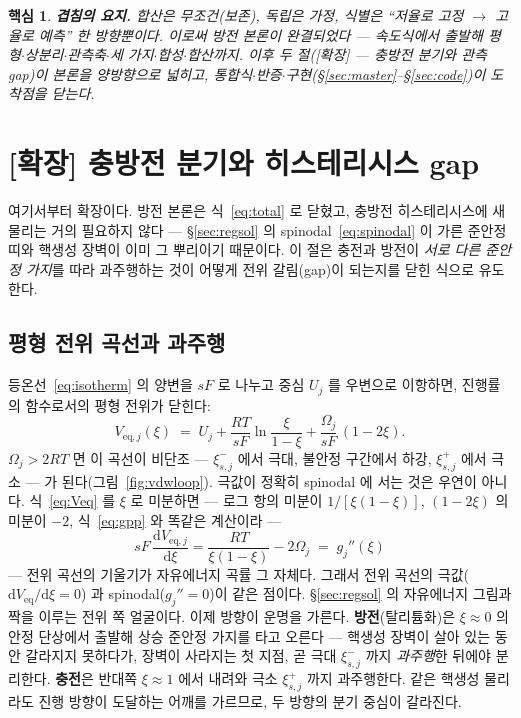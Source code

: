 \documentclass[11pt,a4paper]{article}
\newtheorem*{keybox}{핵심}
\newcommand{\dd}{\mathrm{d}}
\newcommand{\eq}{\mathrm{eq}}
\begin{document}
\begin{keybox}
\textbf{겹침의 요지.} 합산은 무조건(보존), 독립은 가정, 식별은 ``저율로 고정 $\to$ 고율로 예측'' 한
방향뿐이다. 이로써 방전 본론이 완결되었다 — 속도식에서 출발해 평형$\cdot$상분리$\cdot$관측축$\cdot$세
가지$\cdot$합성$\cdot$합산까지. 이후 두 절([확장] — 충방전 분기와 관측 gap)이 본론을 양방향으로
넓히고, 통합식$\cdot$반증$\cdot$구현(\S\ref{sec:master}--\S\ref{sec:code})이 도착점을 닫는다.
\end{keybox}

\section{[확장] 충방전 분기와 히스테리시스 gap}\label{sec:hys}
여기서부터 확장이다. 방전 본론은 식~\eqref{eq:total} 로 닫혔고, 충방전 히스테리시스에 새 물리는
거의 필요하지 않다 — \S\ref{sec:regsol} 의 spinodal~\eqref{eq:spinodal} 이 가른 준안정 띠와
핵생성 장벽이 이미 그 뿌리이기 때문이다. 이 절은 충전과 방전이 \emph{서로
다른 준안정 가지}를 따라 과주행하는 것이 어떻게 전위 갈림(gap)이 되는지를 닫힌 식으로 유도한다.

\subsection{평형 전위 곡선과 과주행}
등온선~\eqref{eq:isotherm} 의 양변을 $sF$ 로 나누고 중심 $U_j$ 를 우변으로 이항하면, 진행률의
함수로서의 평형 전위가 닫힌다:
\begin{equation}
V_{\eq,j}(\xi)\;=\;U_j+\frac{RT}{sF}\ln\frac{\xi}{1-\xi}+\frac{\Omega_j}{sF}\,(1-2\xi).
\label{eq:Veq}
\end{equation}
$\Omega_j>2RT$ 면 이 곡선이 비단조 — $\xi_{s,j}^-$ 에서 극대, 불안정 구간에서 하강, $\xi_{s,j}^+$ 에서
극소 — 가 된다(그림~\ref{fig:vdwloop}). 극값이 정확히 spinodal 에 서는 것은 우연이 아니다.
식~\eqref{eq:Veq} 를 $\xi$ 로 미분하면 — 로그 항의 미분이 $1/[\xi(1-\xi)]$, $(1-2\xi)$ 의
미분이 $-2$, 식~\eqref{eq:gpp} 와 똑같은 계산이라 —
\begin{equation}
sF\,\frac{\dd V_{\eq,j}}{\dd\xi}
=\frac{RT}{\xi(1-\xi)}-2\Omega_j
\;=\;g_j''(\xi)
\label{eq:veqslope}
\end{equation}
— 전위 곡선의 기울기가 자유에너지 곡률 그 자체다. 그래서 전위 곡선의 극값($\dd V_{\eq}/\dd\xi=0$)
과 spinodal($g_j''=0$)이 같은 점이다. \S\ref{sec:regsol} 의 자유에너지 그림과 짝을 이루는 전위 쪽
얼굴이다. 이제 방향이 운명을 가른다. \textbf{방전}(탈리튬화)은 $\xi\approx0$ 의 안정 단상에서 출발해
상승 준안정 가지를 타고 오른다 — 핵생성 장벽이 살아 있는 동안 갈라지지 못하다가, 장벽이 사라지는 첫 지점,
곧 극대 $\xi_{s,j}^-$ 까지 \emph{과주행}한 뒤에야 분리한다. \textbf{충전}은 반대쪽 $\xi\approx1$ 에서
내려와 극소 $\xi_{s,j}^+$ 까지 과주행한다. 같은 핵생성 물리라도 진행 방향이 도달하는 어깨를 가르므로, 두
방향의 분기 중심이 갈라진다.
\end{document}

